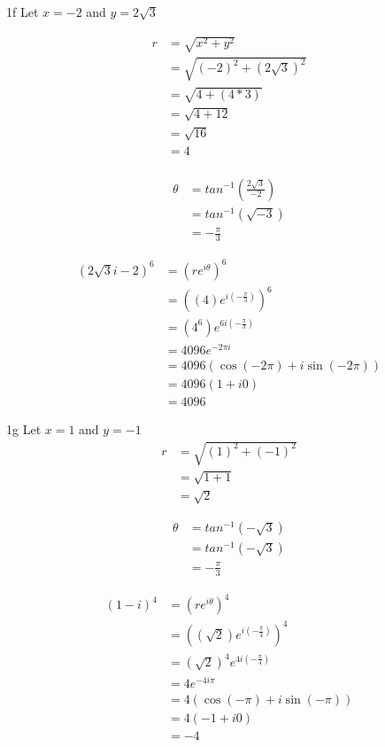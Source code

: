 \begin{question}{1f}
Let $x=-2$ and $y=2\sqrt{3}$

\begin{align*}
r 
 &= \sqrt{x^2 + y^2} \\
 &= \sqrt{(-2)^2 + (2\sqrt{3})^2} \\
 &= \sqrt{4 + (4*3)} \\
 &= \sqrt{4 + 12} \\
 &= \sqrt{16} \\
 &= 4 \\
\end{align*}

\begin{align*}
\theta 
&= tan^{-1}(\frac{2\sqrt{3}}{-2}) \\
&= tan^{-1}(\sqrt{-3}) \\
&= -\frac{\pi}{3}
\end{align*}

\begin{align*}
(2\sqrt{3}i-2)^{6}
 &= (re^{i\theta})^6\\ 
 &= ((4)e^{i(-\frac{\pi}{3})})^6\\ 
 &= (4^6)e^{6i(-\frac{\pi}{3})}\\ 
 &= 4096e^{-2\pi i}\\ 
 &= 4096(\cos(-2\pi) + i\sin(-2\pi))\\ 
 &= 4096(1 + i0)\\ 
 &= 4096 
\end{align*}


\end{question}
\begin{question}{1g}
Let $x=1$ and $y=-1$
\begin{align*}
r
&= \sqrt{(1)^2+(-1)^2} \\
&= \sqrt{1+1} \\
&= \sqrt{2}
\end{align*}

\begin{align*}
\theta
 &= tan^{-1}(-\sqrt{3}) \\
 &= tan^{-1}(-\sqrt{3}) \\
 &= -\frac{\pi}{3}
\end{align*}

\begin{align*}
(1-i)^{4}
 &= (re^{i\theta})^4\\ 
 &= ((\sqrt{2})e^{i(-\frac{\pi}{4})})^4\\ 
 &= (\sqrt{2})^4e^{4i(-\frac{\pi}{4})}\\ 
 &= 4e^{-4i\pi}\\ 
 &= 4(\cos(-\pi)+i\sin(-\pi))\\
 &= 4(-1+i0)\\
 &= -4
\end{align*}
\end{question}

